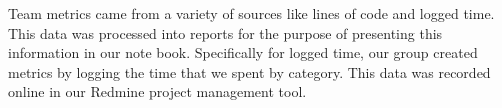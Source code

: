 Team metrics came from a variety of sources
like lines of code and logged time.
This data was processed into reports
for the purpose of presenting this information in our note book.
Specifically for logged time,
our group created metrics by logging the time that we spent by category.
This data was recorded online in our Redmine project management tool.

